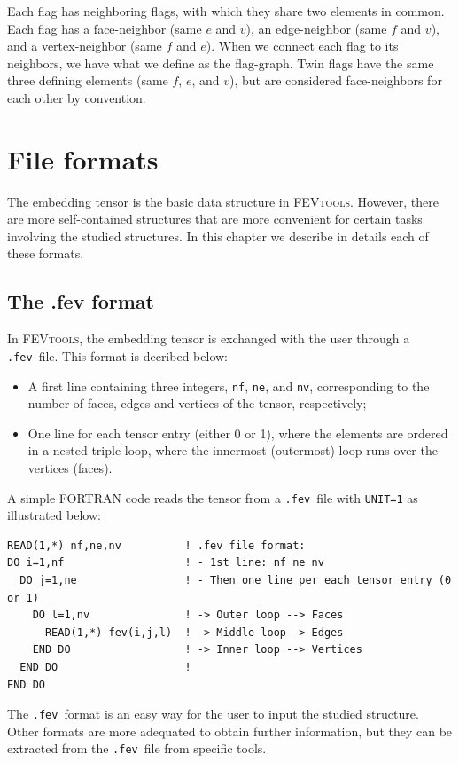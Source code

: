 \documentclass{scrreprt}
\newcommand{\fev}{\texttt{.fev}}
\begin{document}
Each flag has neighboring flags, with which they share two elements in common. Each flag has a face-neighbor (same $e$ and $v$), an edge-neighbor (same $f$ and $v$), and a vertex-neighbor (same $f$ and $e$).  When we connect each flag to its neighbors, we have what we define as the flag-graph. Twin flags have the same three defining elements (same $f$, $e$, and $v$), but are considered face-neighbors for each other by convention.


\chapter{File formats}

The embedding tensor is the basic data structure in \textsc{FEVtools}. However, there are more self-contained structures that are more convenient for certain tasks involving the studied structures. In this chapter we describe in details each of these formats. 

\section{The .fev format}

In \textsc{FEVtools}, the embedding tensor is exchanged with the user through a \fev~file. This format is decribed below:
\begin{itemize}
 \item A first line containing three integers, \verb-nf-, \verb-ne-, and \verb-nv-, corresponding to the number of faces, edges and vertices of the tensor, respectively;
 \item One line for each tensor entry (either 0 or 1), where the elements are ordered in a nested triple-loop, where the innermost (outermost) loop runs over the vertices (faces).
\end{itemize}
A simple \textsc{FORTRAN} code reads the tensor from a \fev~file with \verb-UNIT=1- as illustrated below: 
\begin{verbatim}
READ(1,*) nf,ne,nv          ! .fev file format:
DO i=1,nf                   ! - 1st line: nf ne nv
  DO j=1,ne                 ! - Then one line per each tensor entry (0 or 1)
    DO l=1,nv               ! -> Outer loop --> Faces
      READ(1,*) fev(i,j,l)  ! -> Middle loop -> Edges
    END DO                  ! -> Inner loop --> Vertices
  END DO                    !
END DO   
\end{verbatim}

The \fev~format is an easy way for the user to input the studied structure. Other formats are more adequated to obtain further information, but they can be extracted from the \fev~file from specific tools.
\end{document}
